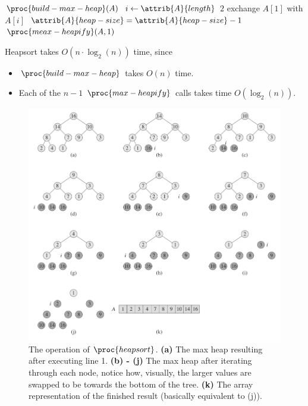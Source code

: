 \documentclass{article}
\begin{document}
\begin{codebox}
\li $\proc{build-max-heap}(A)$
\li \For $i \gets \attrib{A}{length}$ \Downto $2$
\li \Do
        exchange $A[1]$ with $A[i]$
\li     $\attrib{A}{heap-size} = \attrib{A}{heap-size} - 1$
\li     $\proc{meax-heapify}(A, 1)$
    \End
\end{codebox}

Heapsort takes $O(n \cdot \log_2(n))$ time, since
\begin{itemize}
    \item $\proc{build-max-heap}$ takes $O(n)$ time.
    \item Each of the $n-1$ $\proc{max-heapify}$ calls takes time $O(\log_2(n))$.
\end{itemize}

\newpage

\begin{figure}[!ht]
\centering
\includegraphics[scale=0.65]{heapsort}
\caption{
    The operation of $\proc{heapsort}$. \textbf{(a)} The max heap resulting after executing line 1. \textbf{(b) - (j)} The max heap after iterating through each node, notice how, visually, the larger values are swapped to be towards the bottom of the tree. \textbf{(k)} The array representation of the finished result (basically equivalent to (j)).
}
\label{fig:heapsort}
\end{figure}
\end{document}

